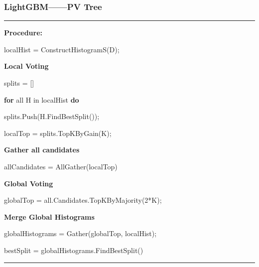 \documentclass[usenames,dvipsnames]{beamer}
\begin{document}
\begin{frame}
\frametitle{LightGBM——PV Tree}
\noindent\rule[0.10\baselineskip]{\textwidth}{0.75pt}
    \textbf{Procedure:}\par
    \hspace*{32pt}  localHist = ConstructHistogramS(D);\par
    \hspace*{32pt}  \textbf{Local Voting}\par
    \hspace*{32pt}  splits = []\par
    \hspace*{32pt}  \textbf{for} all H in localHist \textbf{do}\par
    \hspace*{48pt}  splits.Push(H.FindBestSplit());\par
    \hspace*{32pt}  localTop = splits.TopKByGain(K);\par
    \hspace*{32pt}  \textbf{Gather all candidates}\par
    \hspace*{32pt}  allCandidates = AllGather(localTop)\par
    \hspace*{32pt}  \textbf{Global Voting}\par
    \hspace*{32pt}  globalTop = all.Candidates.TopKByMajority(2*K);\par
    \hspace*{32pt}  \textbf{Merge Global Histograms}\par
    \hspace*{32pt}  globalHistograms = Gather(globalTop, localHist);\par
    \hspace*{32pt}  bestSplit = globalHistograms.FindBestSplit()\\
\noindent\rule[0.10\baselineskip]{\textwidth}{0.75pt}\par
\end{frame}
\end{document}
